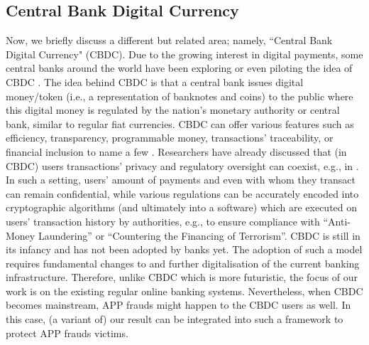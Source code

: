 \subsection{Central Bank Digital Currency}

Now, we briefly discuss a different but related area; namely, ``Central Bank Digital Currency" (CBDC). Due to the growing interest in digital payments, some central banks around the world have been exploring or even piloting the idea of CBDC \cite{CBDC}.  The idea behind CBDC is that a central bank issues digital money/token (i.e., a representation of banknotes and coins) to the public where this digital money is regulated by the nation's monetary authority or central bank, similar to regular fiat currencies. CBDC can offer various features such as efficiency, transparency, programmable money, transactions' traceability, or financial inclusion to name a few \cite{CBDC,CBDC-core-features}. Researchers have already discussed that (in CBDC) users transactions' privacy and regulatory oversight can coexist, e.g., in \cite{abs-2103-00254,WustKCC19}. In such a setting, users' amount of payments and even with whom they transact can remain confidential, while  various regulations can be accurately encoded  into cryptographic algorithms (and ultimately into a software) which are executed on users' transaction history by  authorities, e.g., to ensure compliance with ``Anti-Money Laundering'' or ``Countering the Financing of Terrorism''.  CBDC is still in its infancy and has not been adopted by banks yet. The adoption of such a model requires fundamental changes to and further digitalisation of the current banking  infrastructure. Therefore, unlike CBDC which is more futuristic, the focus of our work is on the existing regular  online banking systems.  Nevertheless, when CBDC becomes mainstream, APP frauds  might happen to the CBDC users as well. In this case, (a variant of) our result can be integrated into  such a framework to protect  APP frauds victims.  





